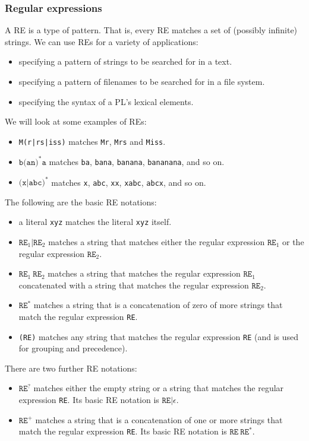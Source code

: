 \documentclass[a4paper, openany]{memoir}
\begin{document}
\subsubsection{Regular expressions}
A RE is a type of pattern. That is, every RE matches a set of (possibly infinite) strings. We can use REs for a variety of applications:
\begin{itemize}
    \item specifying a pattern of strings to be searched for in a text.
    \item specifying a pattern of filenames to be searched for in a file system.
    \item specifying the syntax of a PL's lexical elements.
\end{itemize}
We will look at some examples of REs:
\begin{itemize}
    \item \texttt{M(r|rs|iss)} matches \texttt{Mr}, \texttt{Mrs} and \texttt{Miss}.
    \item $\texttt{b(an)}^{\texttt{*}}\texttt{a}$ matches \texttt{ba}, \texttt{bana}, \texttt{banana}, \texttt{bananana}, and so on.
    \item $\texttt{(x|abc)}^{\texttt{*}}$ matches \texttt{x}, \texttt{abc}, \texttt{xx}, \texttt{xabc}, \texttt{abcx}, and so on.
\end{itemize}
The following are the basic RE notations:
\begin{itemize}
    \item a literal \texttt{xyz} matches the literal \texttt{xyz} itself.
    \item $\texttt{RE}_1|\texttt{RE}_2$ matches a string that matches either the regular expression $\texttt{RE}_1$ or the regular expression $\texttt{RE}_2$.
    \item $\texttt{RE}_1 \ \texttt{RE}_2$ matches a string that matches the regular expression $\texttt{RE}_1$ concatenated with a string that matches the regular expression $\texttt{RE}_2$.
    \item $\texttt{RE}^{\texttt{*}}$ matches a string that is a concatenation of zero of more strings that match the regular expression \texttt{RE}.
    \item \texttt{(RE)} matches any string that matches the regular expression \texttt{RE} (and is used for grouping and precedence).
\end{itemize}
There are two further RE notations:
\begin{itemize}
    \item $\texttt{RE}^?$ matches either the empty string or a string that matches the regular expression \texttt{RE}. Its basic RE notation is $\texttt{RE}|\epsilon$.
    \item $\texttt{RE}^{\texttt{+}}$ matches a string that is a concatenation of one or more strings that match the regular expression \texttt{RE}. Its basic RE notation is $\texttt{RE} \ \texttt{RE}^{\texttt{*}}$.
\end{itemize}
\end{document}
